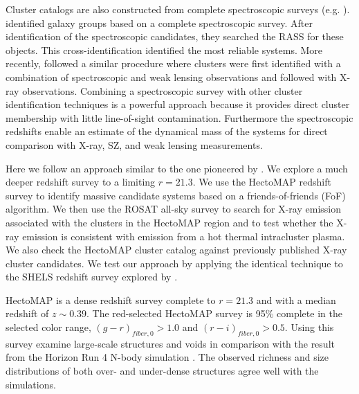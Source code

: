 \documentclass[iop, apj]{emulateapj}
\begin{document}
Cluster catalogs are also constructed from complete spectroscopic surveys
 (e.g. \citealp{Geller83, Mahdavi00, Finoguenov09, Robotham11, Tempel16}). 
\citet{Mahdavi00} identified galaxy groups based on a complete spectroscopic survey. 
After identification of the spectroscopic candidates, 
 they searched the RASS for these objects. 
This cross-identification identified the most reliable systems. 
More recently, 
 \citet{Starikova14} followed a similar procedure 
 where clusters were first identified with a combination of spectroscopic and
 weak lensing observations and followed with X-ray observations. 
Combining a spectroscopic survey with other cluster identification techniques is a powerful approach 
 because it provides direct cluster membership with little line-of-sight contamination. 
Furthermore the spectroscopic redshifts enable  
 an estimate of the dynamical mass of the systems for direct comparison with X-ray, SZ, and weak lensing measurements. 

Here we follow an approach similar to the one pioneered by \citet{Mahdavi00}. 
 We explore a much deeper redshift survey to a limiting $r = 21.3$.
We use the HectoMAP \citep{Geller11, Geller15} redshift survey to identify massive candidate systems 
 based on a friends-of-friends (FoF) algorithm. 
We then use the ROSAT all-sky survey 
 to search for X-ray emission associated with the clusters in the HectoMAP region 
 and to test whether the X-ray emission is consistent with  emission
 from a hot thermal intracluster plasma. 
We also check the HectoMAP cluster catalog 
 against previously published X-ray cluster candidates. 
We test our approach by applying the identical technique to 
 the SHELS redshift survey \citep{Geller10, Geller12, Geller14} explored by \citet{Starikova14}.
 
HectoMAP is a dense redshift survey complete to $r = 21.3$ 
 and with a median redshift of $z \sim 0.39$. 
The red-selected HectoMAP survey is 95\% complete in the selected color range,
 $(g-r)_{fiber, 0} > 1.0$ and $(r-i)_{fiber, 0} > 0.5$. 
Using this survey
 \citet{Hwang16} examine large-scale structures and voids 
 in comparison with the result from the Horizon Run 4 N-body simulation \citep{Kim15}. 
The observed richness and size distributions of both over- and under-dense structures
 agree well with the simulations.
  
\end{document}
